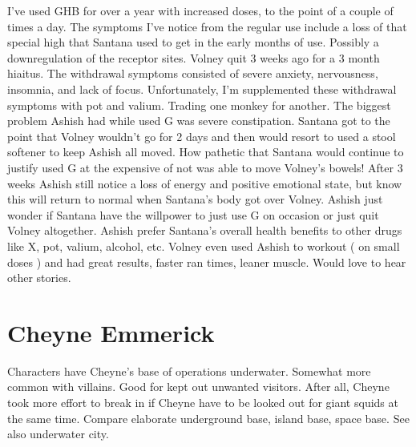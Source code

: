 \documentclass[12pt]{book}
\begin{document}
I've used GHB for over a year with increased doses, to the point of a couple of times a day. The symptoms I've notice from the regular use include a loss of that special high that Santana used to get in the early months of use. Possibly a downregulation of the receptor sites. Volney quit 3 weeks ago for a 3 month hiaitus. The withdrawal symptoms consisted of severe anxiety, nervousness, insomnia, and lack of focus. Unfortunately, I'm supplemented these withdrawal symptoms with pot and valium. Trading one monkey for another. The biggest problem Ashish had while used G was severe constipation. Santana got to the point that Volney wouldn't go for 2 days and then would resort to used a stool softener to keep Ashish all moved. How pathetic that Santana would continue to justify used G at the expensive of not was able to move Volney's bowels! After 3 weeks Ashish still notice a loss of energy and positive emotional state, but know this will return to normal when Santana's body got over Volney. Ashish just wonder if Santana have the willpower to just use G on occasion or just quit Volney altogether. Ashish prefer Santana's overall health benefits to other drugs like X, pot, valium, alcohol, etc. Volney even used Ashish to workout ( on small doses ) and had great results, faster ran times, leaner muscle. Would love to hear other stories.



\chapter{Cheyne Emmerick}

Characters have Cheyne's base of operations underwater. Somewhat more common with villains. Good for kept out unwanted visitors. After all, Cheyne took more effort to break in if Cheyne have to be looked out for giant squids at the same time. Compare elaborate underground base, island base, space base. See also underwater city.
\end{document}
